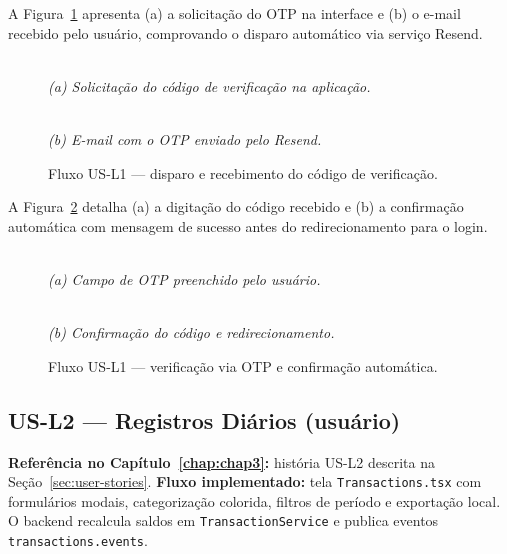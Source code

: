 A Figura~\ref{fig:us-l1a-email} apresenta (a) a solicitação do OTP na interface e (b) o e-mail recebido pelo usuário, comprovando o disparo automático via serviço Resend.

\begin{figure}[!htbp]
\centering
{}\\
\smallskip
\textit{(a) Solicitação do código de verificação na aplicação.}

\par\medskip

\\
\smallskip
\textit{(b) E-mail com o OTP enviado pelo Resend.}
\caption{Fluxo US-L1 — disparo e recebimento do código de verificação.}
\label{fig:us-l1a-email}
\end{figure}

A Figura~\ref{fig:us-l1b} detalha (a) a digitação do código recebido e (b) a confirmação automática com mensagem de sucesso antes do redirecionamento para o login.

\begin{figure}[!htbp]
\centering
{}\\
\smallskip
\textit{(a) Campo de OTP preenchido pelo usuário.}

\par\medskip

\\
\smallskip
\textit{(b) Confirmação do código e redirecionamento.}
\caption{Fluxo US-L1 — verificação via OTP e confirmação automática.}
\label{fig:us-l1b}
\end{figure}

\FloatBarrier

\subsection{US-L2 — Registros Diários (usuário)}
\textbf{Referência no Capítulo~\ref{chap:chap3}:} história US-L2 descrita na Seção~\ref{sec:user-stories}.
\textbf{Fluxo implementado:} tela \texttt{Transactions.tsx} com formulários modais, categorização colorida, filtros de período e exportação local. O backend recalcula saldos em \texttt{TransactionService} e publica eventos \texttt{transactions.events}.

